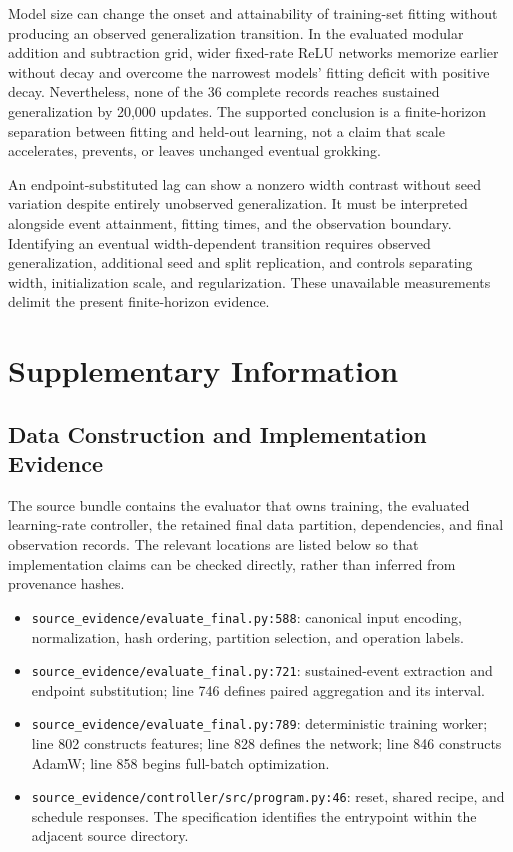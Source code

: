 \documentclass{article}
\begin{document}
Model size can change the onset and attainability of training-set fitting without producing an observed generalization transition. In the evaluated modular addition and subtraction grid, wider fixed-rate ReLU networks memorize earlier without decay and overcome the narrowest models' fitting deficit with positive decay. Nevertheless, none of the 36 complete records reaches sustained generalization by 20,000 updates. The supported conclusion is a finite-horizon separation between fitting and held-out learning, not a claim that scale accelerates, prevents, or leaves unchanged eventual grokking.

An endpoint-substituted lag can show a nonzero width contrast without seed variation despite entirely unobserved generalization. It must be interpreted alongside event attainment, fitting times, and the observation boundary. Identifying an eventual width-dependent transition requires observed generalization, additional seed and split replication, and controls separating width, initialization scale, and regularization. These unavailable measurements delimit the present finite-horizon evidence.

\clearpage



\clearpage
\appendix
\section{Supplementary Information}

\subsection{Data Construction and Implementation Evidence}
\label{app:construction}

The source bundle contains the evaluator that owns training, the evaluated learning-rate controller, the retained final data partition, dependencies, and final observation records. The relevant locations are listed below so that implementation claims can be checked directly, rather than inferred from provenance hashes.
\begin{itemize}
\item \texttt{source\_evidence/evaluate\_final.py:588}: canonical input encoding, normalization, hash ordering, partition selection, and operation labels.
\item \texttt{source\_evidence/evaluate\_final.py:721}: sustained-event extraction and endpoint substitution; line 746 defines paired aggregation and its interval.
\item \texttt{source\_evidence/evaluate\_final.py:789}: deterministic training worker; line 802 constructs features; line 828 defines the network; line 846 constructs AdamW; line 858 begins full-batch optimization.
\item \texttt{source\_evidence/controller/src/program.py:46}: reset, shared recipe, and schedule responses. The specification identifies the entrypoint within the adjacent source directory.
\end{itemize}
\end{document}
